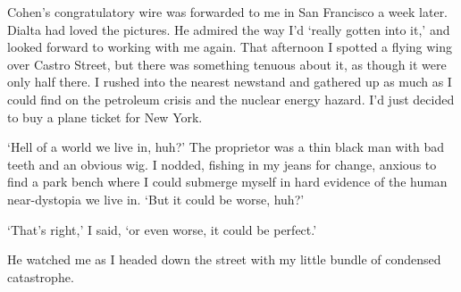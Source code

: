 Cohen's congratulatory wire was forwarded to me in San Francisco a week later. Dialta had loved the pictures. He admired the way I'd `really gotten into it,' and looked forward to working with me again. That afternoon I spotted a flying wing over Castro Street, but there was something tenuous about it, as though it were only half there. I rushed into the nearest newstand and gathered up as much as I could find on the petroleum crisis and the nuclear energy hazard. I'd just decided to buy a plane ticket for New York.

`Hell of a world we live in, huh?' The proprietor was a thin black man with bad teeth and an obvious wig. I nodded, fishing in my jeans for change, anxious to find a park bench where I could submerge myself in hard evidence of the human near-dystopia we live in. `But it could be worse, huh?'

`That's right,' I said, `or even worse, it could be perfect.'

He watched me as I headed down the street with my little bundle of condensed catastrophe.